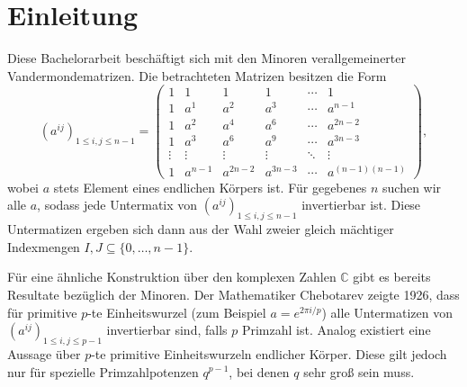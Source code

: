 \section{Einleitung}

Diese Bachelorarbeit beschäftigt sich mit den Minoren verallgemeinerter Vandermondematrizen. Die betrachteten Matrizen besitzen die Form \begin{equation*}
    \left( a^{ij} \right)_{1\leq i,j \leq n-1} = \begin{pmatrix}
        1     & 1    & 1    & 1    &\cdots& 1 \\
        1     & a^1  & a^2  & a^3  &\cdots& a^{n-1} \\
        1     & a^2  & a^4  & a^6  &\cdots& a^{2n-2} \\
        1     & a^3  & a^6  & a^9  &\cdots& a^{3n-3} \\
        \vdots&\vdots&\vdots&\vdots&\ddots&\vdots \\
        1     &a^{n-1}&a^{2n-2}&a^{3n-3}&\cdots&a^{(n-1)(n-1)}
    \end{pmatrix},
\end{equation*}
wobei $a$ stets Element eines endlichen Körpers ist. Für gegebenes $n$ suchen wir alle $a$, sodass jede Untermatix von $\left( a^{ij} \right)_{1\leq i,j \leq n-1}$ invertierbar ist.
Diese Untermatizen ergeben sich dann aus der Wahl zweier gleich mächtiger Indexmengen $I,J \subseteq \{0, \dots, n-1\}$.

Für eine ähnliche Konstruktion über den komplexen Zahlen $\mathbb{C}$ gibt es bereits Resultate bezüglich der Minoren. Der Mathematiker Chebotarev zeigte 1926, dass für primitive $p$-te Einheitswurzel (zum Beispiel $a=e^{2\pi i/p}$) alle Untermatizen von $\left( a^{ij} \right)_{1\leq i,j \leq p-1}$ invertierbar sind, falls $p$ Primzahl ist. \cite{CheboProof}
Analog existiert eine Aussage über $p$-te primitive Einheitswurzeln endlicher Körper. Diese gilt jedoch nur für spezielle Primzahlpotenzen $q^{p-1}$, bei denen $q$ sehr groß sein muss. \cite{CheboFiniteFields}
